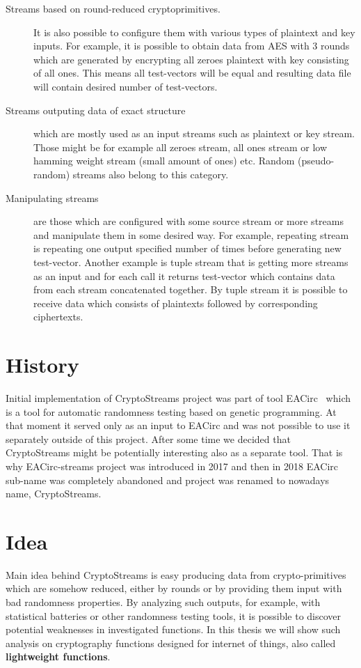 \documentclass[
    digital,    %
    oneside,    %
    color,
    11pt,
    nocover,
    notable,
    nolof,
    nolot,
    final
]{fithesis3}
\begin{document}
\begin{description}
	\item[Streams based on round-reduced cryptoprimitives.] It is also possible to configure them with various types of plaintext and key inputs. For example, it is possible to obtain data from AES with 3 rounds which are generated by encrypting all zeroes plaintext with key consisting of all ones. This means all test-vectors will be equal and resulting data file will contain desired number of test-vectors.
	\item[Streams outputing data of exact structure] which are mostly used as an input streams such as plaintext or key stream. Those might be for example all zeroes stream, all ones stream or low hamming weight stream (small amount of ones) etc. Random (pseudo-random) streams also belong to this category.
	\item[Manipulating streams] are those which are configured with some source stream or more streams and manipulate them in some desired way. For example, repeating stream is repeating one output specified number of times before generating new test-vector. Another example is tuple stream that is getting more streams as an input and for each call it returns test-vector which contains data from each stream concatenated together. By tuple stream it is possible to receive data which consists of plaintexts followed by corresponding ciphertexts. 
\end{description}

\section{History}

Initial implementation of CryptoStreams project was part of tool EACirc~\cite{EACirc} which is a tool for automatic randomness testing based on genetic programming. At that moment it served only as an input to EACirc and was not possible to use it separately outside of this project. After some time we decided that CryptoStreams might be potentially interesting also as a separate tool. That is why EACirc-streams project was introduced in 2017 and then in 2018 EACirc sub-name was completely abandoned and project was renamed to nowadays name, CryptoStreams.

\section{Idea}

Main idea behind CryptoStreams is easy producing data from crypto-primitives which are somehow reduced, either by rounds or by providing them input with bad randomness properties. By analyzing such outputs, for example, with statistical batteries or other randomness testing tools, it is possible to discover potential weaknesses in investigated functions. In this thesis we will show such analysis on cryptography functions designed for internet of things, also called \textbf{lightweight functions}.
\end{document}
